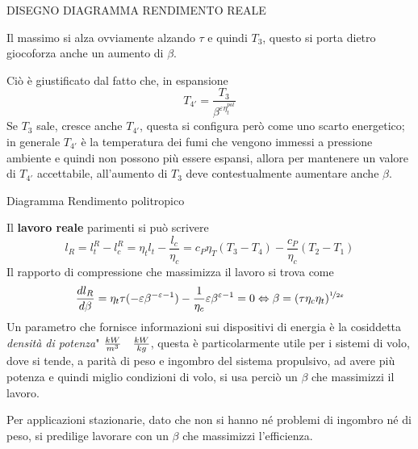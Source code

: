 \begin{adjustwidth}{2in}{}
	
	DISEGNO DIAGRAMMA RENDIMENTO REALE
	
	Il massimo si alza ovviamente alzando $\tau$ e quindi $T_3$, questo si porta dietro giocoforza anche un aumento di $\beta$.  
	
	Ciò è giustificato dal fatto che, in espansione 
	\[T_{4'} = \dfrac{T_3}{\beta^{\varepsilon\eta_t^{pol}}}\]
	Se $T_3$ sale, cresce anche $T_{4'}$, questa si configura però come uno scarto energetico; in generale $T_{4'}$ è la temperatura dei fumi che vengono immessi a pressione ambiente e quindi non possono più essere espansi, allora per mantenere un valore di $T_{4'}$ accettabile, all'aumento di $T_3$ deve contestualmente aumentare anche $\beta$.
	
	Diagramma Rendimento politropico
	
	Il \textbf{lavoro reale} parimenti si può scrivere 
	\[l_R =  l_t^R - l_c^R = \eta_tl_t - \dfrac{l_c}{\eta_c} = c_P\eta_T(T_3-T_4) - \dfrac{c_P}{\eta_c}(T_2-T_1)\]
	Il rapporto di compressione che massimizza il lavoro si trova come 
	\[\dfrac{dl_R}{d\beta} = \eta_t\tau(-\varepsilon\beta^{-\varepsilon-1})-\dfrac{1}{\eta_c}\varepsilon\beta^{\varepsilon-1} =0 \Leftrightarrow \beta = (\tau\eta_c\eta_t)^{\nicefrac{1}{2\varepsilon}}\]
	Un parametro che fornisce informazioni sui dispositivi di energia è la cosiddetta \textit{densità di potenza}" \({kW\over m^3}\quad{kW \over kg}\), questa è particolarmente utile per i sistemi di volo, dove si tende, a parità di peso e ingombro del sistema propulsivo, ad avere più potenza e quindi miglio condizioni di volo, si usa perciò un $\beta$ che massimizzi il lavoro. 
	
	Per applicazioni stazionarie, dato che non si hanno né problemi di ingombro né di peso, si predilige lavorare con un $\beta$ che massimizzi l'efficienza. 	
\end{adjustwidth}	




